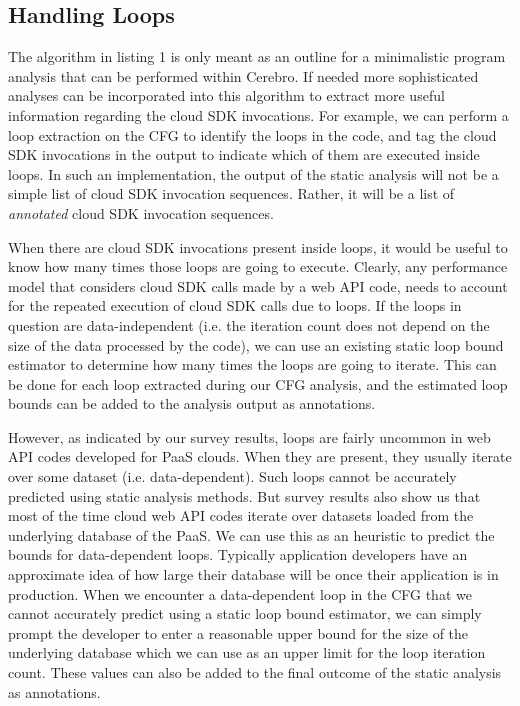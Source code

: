  \subsection{Handling Loops}
The algorithm in listing 1 is only meant as an outline for a minimalistic program analysis that can be performed
within Cerebro. If needed more sophisticated analyses can be incorporated into this algorithm to extract more
useful information regarding the cloud SDK invocations. For example, we can perform a loop extraction on the
CFG to identify the loops in the code, and tag the cloud SDK invocations in the output to indicate which of them
are executed inside loops. In such an implementation, the output of the static analysis will not be a simple
list of cloud SDK invocation sequences. Rather, it will be a list of \textit{annotated} cloud SDK invocation sequences.

When there are cloud SDK invocations present inside loops, it would be useful to know how many times those loops
are going to execute. Clearly, any performance model that considers cloud SDK calls made by a web API code,
needs to account for the repeated execution of cloud SDK calls due to loops. If the 
loops in question are data-independent (i.e. the iteration count does not depend on the size of the data processed 
by the code), we can use an existing static loop bound estimator to determine how many times the loops are going to iterate.
This can be done for each loop extracted during our CFG analysis, and the estimated loop bounds can be added to the
analysis output as annotations.

However, as indicated by our survey results, loops are fairly uncommon in web API codes developed for PaaS clouds. When
they are present, they usually iterate over some dataset (i.e. data-dependent). Such loops cannot
be accurately predicted using static analysis methods. But survey results also show us that
most of the time cloud web API codes iterate over datasets loaded from the underlying database of the PaaS.
We can use this as an heuristic to predict the bounds for data-dependent loops. Typically application developers
have an approximate idea of how large their database will be once their application is in production. When we encounter a data-dependent
loop in the CFG that we cannot accurately predict using a static loop bound estimator, we can simply
prompt the developer to enter a reasonable upper bound for the size of the underlying database which we can
use as an upper limit for the loop iteration count. These values can also be added to the final outcome of the
static analysis as annotations.